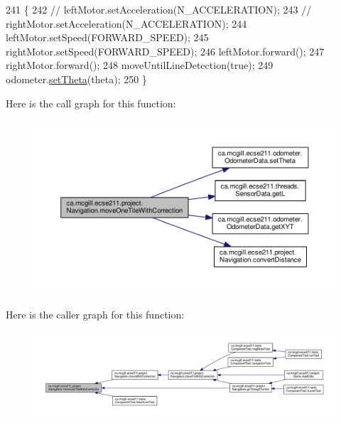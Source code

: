 \begin{DoxyCode}
241                                                       \{
242 \textcolor{comment}{//    leftMotor.setAcceleration(N\_ACCELERATION);}
243 \textcolor{comment}{//    rightMotor.setAcceleration(N\_ACCELERATION);}
244     leftMotor.setSpeed(FORWARD\_SPEED);
245     rightMotor.setSpeed(FORWARD\_SPEED);
246     leftMotor.forward();
247     rightMotor.forward();
248     moveUntilLineDetection(\textcolor{keyword}{true});
249     odometer.\hyperlink{classca_1_1mcgill_1_1ecse211_1_1odometer_1_1_odometer_data_a419b8f07c2c5374411c8e62298e9a402}{setTheta}(theta);
250   \}
\end{DoxyCode}
Here is the call graph for this function\+:
\nopagebreak
\begin{figure}[H]
\begin{center}
\leavevmode
\includegraphics[width=350pt]{classca_1_1mcgill_1_1ecse211_1_1project_1_1_navigation_afbe677941e2bd44e35452e1eff508ae9_cgraph}
\end{center}
\end{figure}
Here is the caller graph for this function\+:
\nopagebreak
\begin{figure}[H]
\begin{center}
\leavevmode
\includegraphics[width=350pt]{classca_1_1mcgill_1_1ecse211_1_1project_1_1_navigation_afbe677941e2bd44e35452e1eff508ae9_icgraph}
\end{center}
\end{figure}
\mbox{\label{classca_1_1mcgill_1_1ecse211_1_1project_1_1_navigation_a48eeb9ae2da23664421e8da5642054c7}} 
